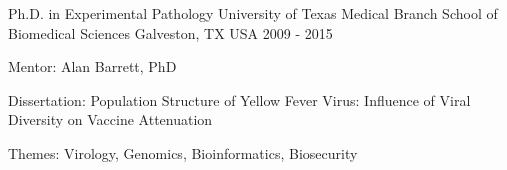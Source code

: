 

\begin{cventries}

  \vspace{-4.0mm}
  \cventry
    {Ph.D. in Experimental Pathology} %
    {University of Texas Medical Branch School of Biomedical Sciences} %
    {Galveston, TX USA} %
    {2009 - 2015} %
    {
      \begin{cvitems} %
        \item {Mentor: Alan Barrett, PhD}
        \item {Dissertation: Population Structure of Yellow Fever Virus: Influence of Viral Diversity on Vaccine Attenuation}
        \item {Themes: Virology, Genomics, Bioinformatics, Biosecurity}
      \end{cvitems}
    } 
    
\end{cventries}
